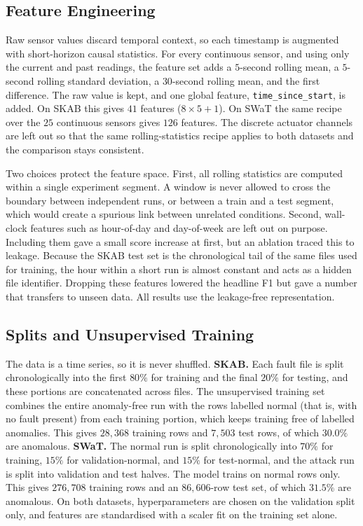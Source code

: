 \documentclass[runningheads]{llncs}
\begin{document}
\subsection{Feature Engineering}
Raw sensor values discard temporal context, so each timestamp is augmented with
short-horizon causal statistics. For every continuous sensor, and using only the
current and past readings, the feature set adds a $5$-second rolling mean, a
$5$-second rolling standard deviation, a $30$-second rolling mean, and the first
difference. The raw value is kept, and one global feature,
\texttt{time\_since\_start}, is added. On SKAB this gives $41$ features
($8 \times 5 + 1$). On SWaT the same recipe over the $25$ continuous sensors
gives $126$ features. The discrete actuator channels are left out so that the
same rolling-statistics recipe applies to both datasets and the comparison stays
consistent.

Two choices protect the feature space. First, all rolling statistics are computed
within a single experiment segment. A window is never allowed to cross the
boundary between independent runs, or between a train and a test segment, which
would create a spurious link between unrelated conditions. Second, wall-clock
features such as hour-of-day and day-of-week are left out on purpose. Including
them gave a small score increase at first, but an ablation traced this to
leakage. Because the SKAB test set is the chronological tail of the same files
used for training, the hour within a short run is almost constant and acts as a
hidden file identifier. Dropping these features lowered the headline F1 but gave
a number that transfers to unseen data. All results use the leakage-free
representation.

\subsection{Splits and Unsupervised Training}
The data is a time series, so it is never shuffled.
\textbf{SKAB.} Each fault file is split chronologically into the first $80\%$ for
training and the final $20\%$ for testing, and these portions are concatenated
across files. The unsupervised training set combines the entire anomaly-free run
with the rows labelled normal (that is, with no fault present) from each training
portion, which keeps training free of labelled anomalies. This gives $28{,}368$ training rows and $7{,}503$ test
rows, of which $30.0\%$ are anomalous.
\textbf{SWaT.} The normal run is split chronologically into $70\%$ for training,
$15\%$ for validation-normal, and $15\%$ for test-normal, and the attack run is
split into validation and test halves. The model trains on normal rows only. This
gives $276{,}708$ training rows and an $86{,}606$-row test set, of which $31.5\%$
are anomalous.
On both datasets, hyperparameters are chosen on the validation split only, and
features are standardised with a scaler fit on the training set alone.
\end{document}
